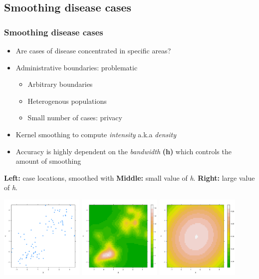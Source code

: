 \documentclass{beamer}
\theoremstyle{definition}
\begin{document}
\subsection{Smoothing disease cases}
\begin{frame}\frametitle{Smoothing disease cases}
    \begin{itemize}
        \item Are cases of disease concentrated in specific areas?
        \item Administrative boundaries: problematic
            \begin{itemize}
                \item Arbitrary boundaries
                \item Heterogenous populations
                \item Small number of cases: privacy
            \end{itemize}
        \item \alert{Kernel smoothing} to compute \emph{intensity} a.k.a \emph{density}
        \item Accuracy is highly dependent on the \emph{bandwidth} \textbf{(h)} which controls the amount of smoothing
    \end{itemize}
    \begin{example}{\tiny{\textbf{Left:} case locations, smoothed with \textbf{Middle:} small value of \emph{h}. \textbf{Right:} large value of \emph{h}.}}
    \centerline{
        \label{fig:points-and-dkd}
        \centering
        \includegraphics[width=0.3\textwidth]{example-incidents}
        \includegraphics[width=0.3\textwidth]{example-incidents-undersmoothed}
        \includegraphics[width=0.3\textwidth]{example-incidents-oversmoothed}
    }
    \end{example}
\end{frame}
\end{document}
